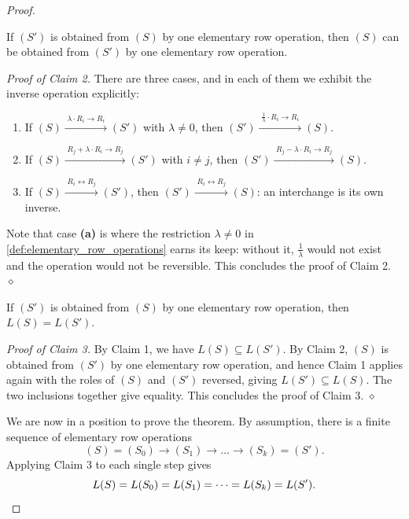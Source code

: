 \begin{proof}
\begin{claim*}
\label{claim:ero_reversible}
If $(S')$ is obtained from $(S)$ by one elementary row operation, then $(S)$ can be obtained from $(S')$ by one elementary row operation.
\end{claim*}

\emph{Proof of Claim 2.} There are three cases, and in each of them we exhibit the inverse operation explicitly:
\begin{enumerate}[label=\textbf{(\alph*)}]
    \item If $(S) \xrightarrow{\;\lambda \cdot R_i \to R_i\;} (S')$ with $\lambda \ne 0$, then $(S') \xrightarrow{\;\frac{1}{\lambda} \cdot R_i \to R_i\;} (S)$.
    \item If $(S) \xrightarrow{\;R_j + \lambda \cdot R_i \to R_j\;} (S')$ with $i \ne j$, then $(S') \xrightarrow{\;R_j - \lambda \cdot R_i \to R_j\;} (S)$.
    \item If $(S) \xrightarrow{\;R_i \leftrightarrow R_j\;} (S')$, then $(S') \xrightarrow{\;R_i \leftrightarrow R_j\;} (S)$: an interchange is its own inverse.
\end{enumerate}
Note that case \textbf{(a)} is where the restriction $\lambda \ne 0$ in \cref{def:elementary_row_operations} earns its keep: without it, $\frac{1}{\lambda}$ would not exist and the operation would not be reversible. This concludes the proof of Claim 2. \hfill $\diamond$

\begin{claim*}
\label{claim:ero_equality}
If $(S')$ is obtained from $(S)$ by one elementary row operation, then $L(S) = L(S')$.
\end{claim*}

\emph{Proof of Claim 3.} By Claim 1, we have $L(S) \subseteq L(S')$. By Claim 2, $(S)$ is obtained from $(S')$ by one elementary row operation, and hence Claim 1 applies again with the roles of $(S)$ and $(S')$ reversed, giving $L(S') \subseteq L(S)$. The two inclusions together give equality. This concludes the proof of Claim 3. \hfill $\diamond$

We are now in a position to prove the theorem. By assumption, there is a finite sequence of elementary row operations
\[
(S) = (S_0) \longrightarrow (S_1) \longrightarrow \dots \longrightarrow (S_k) = (S').
\]
Applying Claim 3 to each single step gives
\[
L(S) = L(S_0) = L(S_1) = \dots = L(S_k) = L(S'). \qedhere
\]
\end{proof}

